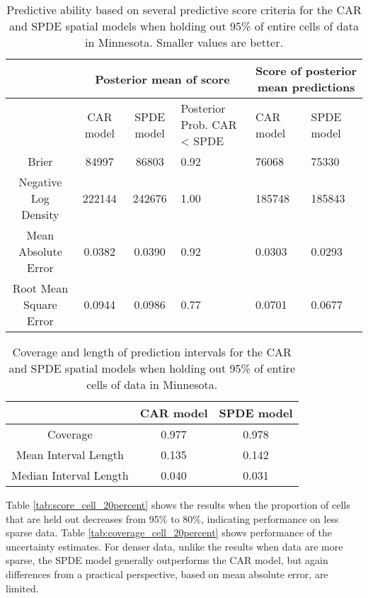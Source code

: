\documentclass[12pt]{article}\usepackage[]{graphicx}\usepackage[]{color}
\providecommand{\tabularnewline}{\\}
\begin{document}
%
\begin{table}


\caption{Predictive ability based on several predictive score criteria for
the CAR and SPDE spatial models when holding out 95\% of entire cells
of data in Minnesota. Smaller values are better.}


\begin{tabular}{|c|c|c|>{\centering}p{3cm}|>{\centering}p{2.5cm}|>{\centering}p{2.5cm}|}
\hline 
 &
\multicolumn{3}{c|}{{\small{Posterior mean of score}}} &
\multicolumn{2}{c|}{{\small{Score of posterior mean predictions}}}\tabularnewline
\hline 
\hline 
 &
{\small{CAR model}} &
{\small{SPDE model}} &
{\small{Posterior Prob. CAR < SPDE}} &
{\small{CAR model}} &
{\small{SPDE model}}\tabularnewline
\hline 
{\small{Brier}} &
{\small{84997}} &
{\small{86803}} &
{\small{0.92}} &
{\small{76068}} &
{\small{75330}}\tabularnewline
\hline 
{\small{Negative Log Density}} &
{\small{222144}} &
{\small{242676}} &
{\small{1.00}} &
{\small{185748}} &
{\small{185843}}\tabularnewline
\hline 
{\small{Mean Absolute Error}} &
{\small{0.0382}} &
{\small{0.0390}} &
{\small{0.92}} &
{\small{0.0303}} &
{\small{0.0293}}\tabularnewline
\hline 
{\small{Root Mean Square Error}} &
{\small{0.0944}} &
{\small{0.0986}} &
{\small{0.77}} &
{\small{0.0701}} &
{\small{0.0677}}\tabularnewline
\hline 
\end{tabular}

\label{tab:score_cell_fivepercent}
\end{table}


\begin{table}
\caption{Coverage and length of prediction intervals for the CAR and SPDE spatial
models when holding out 95\% of entire cells of data in Minnesota. }


\begin{tabular}{|c|c|c|}
\hline 
 &
{\small{CAR model}} &
{\small{SPDE model}}\tabularnewline
\hline 
{\small{Coverage}} &
{\small{0.977}} &
{\small{0.978}}\tabularnewline
\hline 
{\small{Mean Interval Length}} &
{\small{0.135}} &
{\small{0.142}}\tabularnewline
\hline 
{\small{Median Interval Length}} &
{\small{0.040}} &
{\small{0.031}}\tabularnewline
\hline 
\end{tabular}

\label{tab:coverage_cell_fivepercent}
\end{table}




Table \ref{tab:score_cell_20percent} shows the results when the proportion
of cells that are held out decreases from 95\% to 80\%, indicating
performance on less sparse data. Table \ref{tab:coverage_cell_20percent}
shows performance of the uncertainty estimates. For denser data, unlike
the results when data are more sparse, the SPDE model generally outperforms
the CAR model, but again differences from a practical perspective,
based on mean absolute error, are limited.
\end{document}
